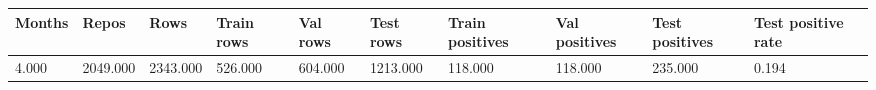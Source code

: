 \begin{table}[t]
\centering
\begin{tabular}{llllllllll}
\hline
Months & Repos & Rows & Train rows & Val rows & Test rows & Train positives & Val positives & Test positives & Test positive rate \\
\hline
4.000 & 2049.000 & 2343.000 & 526.000 & 604.000 & 1213.000 & 118.000 & 118.000 & 235.000 & 0.194 \\
\hline
\end{tabular}
\end{table}